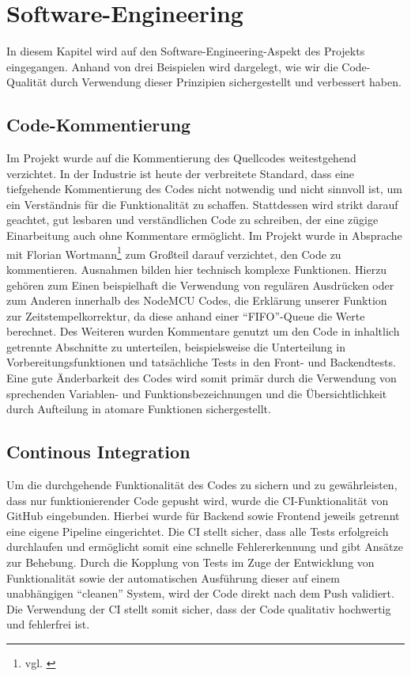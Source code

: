 

\section{Software-Engineering}
In diesem Kapitel wird auf den Software-Engineering-Aspekt des Projekts eingegangen. Anhand von drei Beispielen wird dargelegt, wie wir die Code-Qualität durch Verwendung dieser Prinzipien sichergestellt und verbessert haben.
\subsection*{Code-Kommentierung}
Im Projekt wurde auf die Kommentierung des Quellcodes weitestgehend verzichtet.
In der Industrie ist heute der verbreitete Standard, dass eine tiefgehende Kommentierung des Codes nicht notwendig und nicht sinnvoll ist, um ein Verständnis für die Funktionalität zu schaffen.
Stattdessen wird strikt darauf geachtet, gut lesbaren und verständlichen Code zu schreiben, der eine zügige Einarbeitung auch ohne Kommentare ermöglicht.
Im Projekt wurde in Absprache mit Florian Wortmann\footnote{vgl. \cite{BesprNotiz.2020}} zum Großteil darauf verzichtet, den Code zu kommentieren.
Ausnahmen bilden hier technisch komplexe Funktionen.
Hierzu gehören zum Einen beispielhaft die Verwendung von regulären Ausdrücken oder zum Anderen innerhalb des NodeMCU Codes, die Erklärung unserer Funktion zur Zeitstempelkorrektur, da diese anhand einer \enquote{FIFO}-Queue die Werte berechnet.
Des Weiteren wurden Kommentare genutzt um den Code in inhaltlich getrennte Abschnitte zu unterteilen, beispielsweise die Unterteilung in Vorbereitungsfunktionen und tatsächliche Tests in den Front- und Backendtests.
Eine gute Änderbarkeit des Codes wird somit primär durch die Verwendung von sprechenden Variablen- und Funktionsbezeichnungen und die Übersichtlichkeit durch Aufteilung in atomare Funktionen sichergestellt.
\subsection*{Continous Integration}
Um die durchgehende Funktionalität des Codes zu sichern und zu gewährleisten, dass nur funktionierender Code gepusht wird, wurde die CI-Funktionalität von GitHub eingebunden.
Hierbei wurde für Backend sowie Frontend jeweils getrennt eine eigene Pipeline eingerichtet.
Die CI stellt sicher, dass alle Tests erfolgreich durchlaufen und ermöglicht somit eine schnelle Fehlererkennung und gibt Ansätze zur Behebung.
Durch die Kopplung von Tests im Zuge der Entwicklung von Funktionalität sowie der automatischen Ausführung dieser auf einem unabhängigen \enquote{cleanen} System, wird der Code direkt nach dem Push validiert.
Die Verwendung der CI stellt somit sicher, dass der Code qualitativ hochwertig und fehlerfrei ist.

